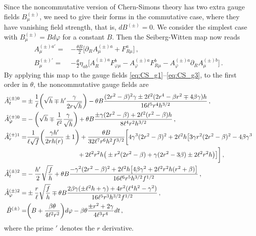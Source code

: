 \documentclass[11pt]{article}
\newcommand{\vap}{\varphi}
\newcommand{\nn}{\nonumber}
\numberwithin{equation}{section}
\begin{document}
Since the noncommutative version of Chern-Simons theory has
two extra gauge fields $B^{(\pm)}_\mu$, we need to give their forms
in the commutative case, where they have vanishing field strength, that is, $dB^{(\pm)}=0$.
We consider the simplest case with $B^{(\pm)}_\mu=Bd\vap$ for a constant $B$.
Then the Seiberg-Witten map now reads 
\begin{align}
  A_\mu^{(\pm)a\prime}=&
-\frac{\theta B}{2} \big[ \partial_R A_\mu^{(\pm)a} + F_{R\mu}^{a} \big] \,,\\
B_\mu^{(\pm)\prime}=& -\frac{\theta}{2} \eta_{ab} \big[ A_R^{(\pm)a} F_{\vap\mu}^b
-A_\vap^{(\pm)a} F_{R\mu}^b - A_\vap^{(\pm)a} \partial_R A_\mu^{(\pm)b} \big] \,.
\end{align}
By applying this map to the gauge fields \eqref{eq:CS_g1}--\eqref{eq:CS_g3},
to the first order in $\theta$, the noncommutative gauge fields are
\begin{align}
  \hat{A}^{(\pm)0}_t
=& \pm \frac{1}{\ell} \bigg( \sqrt{h} \mp h' \frac{\gamma}{2r \sqrt{h}} \bigg)
-\theta B \frac{(2r^2 -\beta)^2 \gamma
\pm 2\ell^2 (2r^4 -\beta r^2 \mp 4\beta \gamma) h}{16 \ell^5 r^4 h^{3/2}} 
\,,
\label{eq:A0t}
\\
  \hat{A}^{(\pm)0}_{\vap}
=&
- \bigg( \sqrt{h} \mp \frac{1}{\ell^2} \frac{\gamma}{\sqrt{h}}\bigg) 
+ \theta B \frac{\pm \gamma (2r^2-\beta) +2\ell^2 (r^2-\beta)h}{8 \ell^4 r^2 h^{3/2}}
\label{eq:A0f}
\,,\\
\hat{A}^{(\pm)1}_r=&
\frac{1}{\ell \sqrt{f}} \bigg( \frac{\gamma {h}'}{2r h(r)} \pm 1 \bigg) 
+\frac{\theta B}{32 \ell^7 r^6 h^2 f^{3/2}}
 \bigg[ 4\gamma^3(2r^2-\beta)^2+2\ell^2 h \big[3\gamma
                     r^2(2r^2-\beta)^2-4\beta \gamma^3
\nn\\& \hskip8em 
+2\ell^2 r^2 h
                     \big( \pm r^2(2r^2-\beta)+\gamma(2r^2-3\beta) \pm
                     2\ell^2 r^2 h \big) \big] \bigg]
 \,,
\label{eq:A1r}
\\
\hat{A}^{(\pm)2}_t=& 
- \frac{h'}{2} \sqrt{\frac{f}{h}}
+\theta B \frac{-\gamma^2 (2r^2-\beta)^2 +2\ell^2 h \big[  4 \beta \gamma^2 + 2\ell^2 r^2h (r^2+\beta)\big]}{16\ell^6 r^5 h^{3/2} {f}^{1/2}}
\label{eq:A2t}
\,,\\
\hat{A}^{(\pm)2}_\vap=& 
\pm \frac{r}{\ell} \sqrt{\frac{f}{h}}
\mp \theta B \frac{2 \beta \gamma (\pm \ell^2 h + \gamma)+ 4r^2 (\ell^4 h^2 -\gamma^2)}{16\ell^5 r^3 h^{3/2} {f}^{1/2}}
\label{eq:A2f}
 \,,\\
  \hat{B}^{(\pm)}=& \bigg( B +\frac{\beta \theta}{4\ell^2 r^2} \bigg) d\vap
-\beta\theta \frac{\pm r^2 + 2\gamma}{4\ell^3 r^4} dt \,,
\label{eq:Btf}
\end{align}
where the prime ${}'$ denotes the $r$ derivative.
\end{document}
